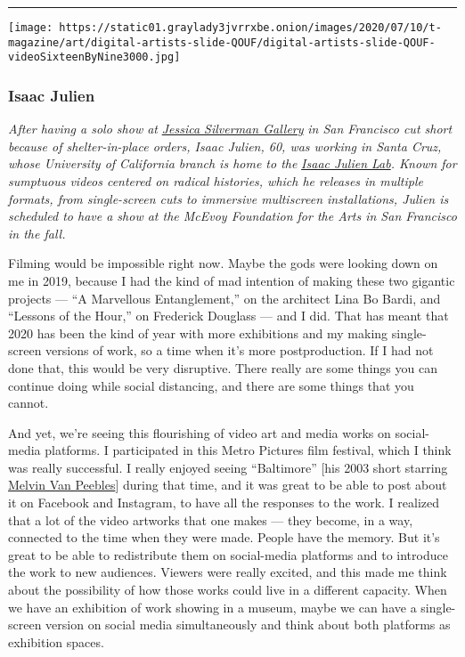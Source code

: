 \begin{center}\rule{0.5\linewidth}{\linethickness}\end{center}

\texttt{[image: https://static01.graylady3jvrrxbe.onion/images/2020/07/10/t-magazine/art/digital-artists-slide-QOUF/digital-artists-slide-QOUF-videoSixteenByNine3000.jpg]}

\hypertarget{isaac-julien}{%
\subsubsection{\texorpdfstring{\textbf{Isaac
Julien}}{Isaac Julien}}\label{isaac-julien}}

\emph{After having a solo show at}
\href{https://www.nytimes3xbfgragh.onion/2020/01/22/t-magazine/jessica-silverman-gallery.html}{\emph{Jessica
Silverman Gallery}} \emph{in San Francisco cut short because of
shelter-in-place orders, Isaac Julien, 60, was working in Santa Cruz,
whose University of California branch is home to the}
\href{https://danm.ucsc.edu/project_group/isaac-julien-lab}{\emph{Isaac
Julien Lab}}\emph{. Known for sumptuous videos centered on radical
histories, which he releases in multiple formats, from single-screen
cuts to immersive multiscreen installations, Julien is scheduled to have
a show at the McEvoy Foundation for the Arts in San Francisco in the
fall.}

Filming would be impossible right now. Maybe the gods were looking down
on me in 2019, because I had the kind of mad intention of making these
two gigantic projects --- ``A Marvellous Entanglement,'' on the
architect Lina Bo Bardi, and ``Lessons of the Hour,'' on Frederick
Douglass --- and I did. That has meant that 2020 has been the kind of
year with more exhibitions and my making single-screen versions of work,
so a time when it's more postproduction. If I had not done that, this
would be very disruptive. There really are some things you can continue
doing while social distancing, and there are some things that you
cannot.

And yet, we're seeing this flourishing of video art and media works on
social-media platforms. I participated in this Metro Pictures film
festival, which I think was really successful. I really enjoyed seeing
``Baltimore'' {[}his 2003 short starring
\href{https://www.nytimes3xbfgragh.onion/2013/09/20/arts/design/melvin-van-peebles-headlines-a-group-art-show.html}{Melvin
Van Peebles}{]} during that time, and it was great to be able to post
about it on Facebook and Instagram, to have all the responses to the
work. I realized that a lot of the video artworks that one makes ---
they become, in a way, connected to the time when they were made. People
have the memory. But it's great to be able to redistribute them on
social-media platforms and to introduce the work to new audiences.
Viewers were really excited, and this made me think about the
possibility of how those works could live in a different capacity. When
we have an exhibition of work showing in a museum, maybe we can have a
single-screen version on social media simultaneously and think about
both platforms as exhibition spaces.


